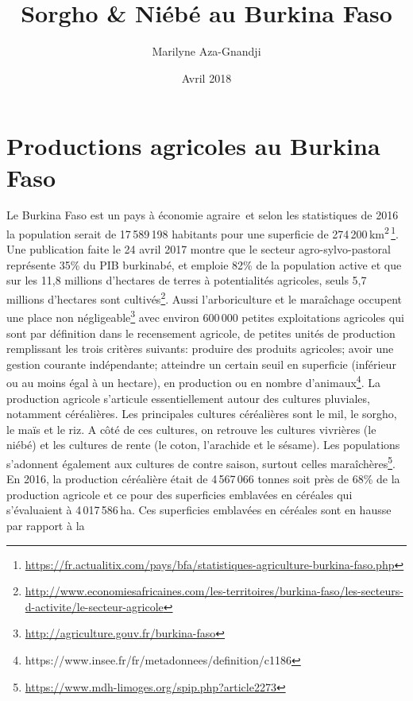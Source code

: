 \documentclass[a4paper,11pt]{article}
\begin{document}
\title{Sorgho \& Niébé au Burkina Faso}
\author{Marilyne Aza-Gnandji}
\date{Avril 2018} 

\maketitle
\tableofcontents

\section{Productions agricoles au Burkina Faso}

Le Burkina Faso est un pays à économie
agraire\,\cite{Koulibi_FideleZONGO} et selon les statistiques de 2016 la
population serait de 17\,589\,198 habitants pour une superficie de
274\,200\,km\textsuperscript{2}\,\footnote{\url{https://fr.actualitix.com/pays/bfa/statistiques-agriculture-burkina-faso.php}}. Une
publication faite le 24 avril 2017 montre que le secteur
agro-sylvo-pastoral représente 35\% du PIB burkinabé, et emploie 82\%
de la population active et que sur les 11,8 millions d'hectares de
terres à potentialités agricoles, seuls 5,7 millions d’hectares sont
cultivés\footnote{\url{http://www.economiesafricaines.com/les-territoires/burkina-faso/les-secteurs-d-activite/le-secteur-agricole}}. Aussi
l'arboriculture et le maraîchage occupent une place non
négligeable\footnote{\url{http://agriculture.gouv.fr/burkina-faso}}
avec environ 600\,000 petites exploitations agricoles qui sont par
définition dans le recensement agricole, de petites unités de
production remplissant les trois critères suivants: produire des
produits agricoles; avoir une gestion courante indépendante; atteindre
un certain seuil en superficie (inférieur ou au moins égal à un
hectare), en production ou en nombre
d’animaux\footnote{https://www.insee.fr/fr/metadonnees/definition/c1186}. La
production agricole s’articule essentiellement autour des cultures
pluviales, notamment céréalières. Les principales cultures céréalières
sont le mil, le sorgho, le maïs et le riz. A côté de ces cultures, on
retrouve les cultures vivrières (le niébé) et les cultures de rente
(le coton, l’arachide et le sésame). Les populations s’adonnent
également aux cultures de contre saison, surtout celles
maraîchères\footnote{\url{https://www.mdh-limoges.org/spip.php?article2273}}.
En 2016, la production céréalière était de 4\,567\,066 tonnes soit
près de 68\% de la production agricole et ce pour des superficies
emblavées en céréales qui s'évaluaient à 4\,017\,586\,ha. Ces
superficies emblavées en céréales sont en hausse par rapport à la
\end{document}
